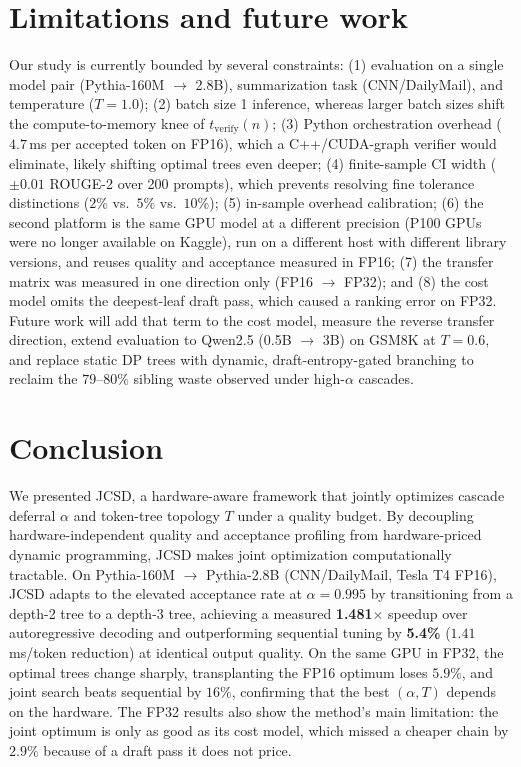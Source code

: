 \documentclass[10pt]{article}
\begin{document}
\section{Limitations and future work}

Our study is currently bounded by several constraints: (1) evaluation on a single model pair (Pythia-160M $\to$ 2.8B), summarization task (CNN/DailyMail), and temperature ($T=1.0$); (2) batch size 1 inference, whereas larger batch sizes shift the compute-to-memory knee of $t_{\mathrm{verify}}(n)$; (3) Python orchestration overhead ($4.7$\,ms per accepted token on FP16), which a C++/CUDA-graph verifier would eliminate, likely shifting optimal trees even deeper; (4) finite-sample CI width ($\pm 0.01$ ROUGE-2 over 200 prompts), which prevents resolving fine tolerance distinctions ($2\%$ vs.\ $5\%$ vs.\ $10\%$); (5) in-sample overhead calibration; (6) the second platform is the same GPU model at a different precision (P100 GPUs were no longer available on Kaggle), run on a different host with different library versions, and reuses quality and acceptance measured in FP16; (7) the transfer matrix was measured in one direction only (FP16 $\to$ FP32); and (8) the cost model omits the deepest-leaf draft pass, which caused a ranking error on FP32. Future work will add that term to the cost model, measure the reverse transfer direction, extend evaluation to Qwen2.5 (0.5B $\to$ 3B) on GSM8K at $T=0.6$, and replace static DP trees with dynamic, draft-entropy-gated branching to reclaim the $79$--$80\%$ sibling waste observed under high-$\alpha$ cascades.

\section{Conclusion}

We presented JCSD, a hardware-aware framework that jointly optimizes cascade deferral $\alpha$ and token-tree topology $T$ under a quality budget. By decoupling hardware-independent quality and acceptance profiling from hardware-priced dynamic programming, JCSD makes joint optimization computationally tractable. On Pythia-160M $\to$ Pythia-2.8B (CNN/DailyMail, Tesla T4 FP16), JCSD adapts to the elevated acceptance rate at $\alpha = 0.995$ by transitioning from a depth-2 tree to a depth-3 tree, achieving a measured \textbf{1.481$\times$} speedup over autoregressive decoding and outperforming sequential tuning by \textbf{5.4\%} ($1.41$\,ms/token reduction) at identical output quality. On the same GPU in FP32, the optimal trees change sharply, transplanting the FP16 optimum loses $5.9\%$, and joint search beats sequential by $16\%$, confirming that the best $(\alpha, T)$ depends on the hardware. The FP32 results also show the method's main limitation: the joint optimum is only as good as its cost model, which missed a cheaper chain by $2.9\%$ because of a draft pass it does not price.
\end{document}

